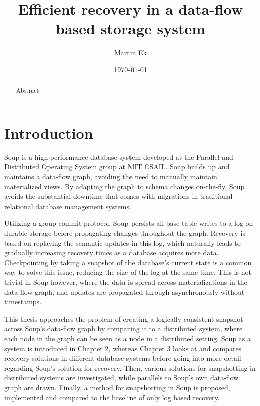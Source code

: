 \documentclass[b5paper]{report}
\begin{document}
\title{Efficient recovery in a data-flow based storage system}
\author{Martin Ek}
\date{\today}
\maketitle



\begin{abstract}
  Abstract
\end{abstract}

\tableofcontents
\pagebreak

\chapter{Introduction}
Soup is a high-performance database system developed at the Parallel and
Distributed Operating System group at MIT CSAIL. Soup builds up and maintains a
data-flow graph, avoiding the need to manually maintain materialized views. By
adapting the graph to schema changes on-the-fly, Soup avoids the substantial
downtime that comes with migrations in traditional relational database
management systems.

Utilizing a group-commit protocol, Soup persists all base table writes to
a log on durable storage before propagating changes throughout the graph.
Recovery is based on replaying the semantic updates in this log, which naturally
leads to gradually increasing recovery times as a database acquires more data.
Checkpointing by taking a snapshot of the database's current state is a common
way to solve this issue, reducing the size of the log at the same time. This is
not trivial in Soup however, where the data is spread across materializations in
the data-flow graph, and updates are propagated through asynchronously without
timestamps.

This thesis approaches the problem of creating a logically consistent snapshot
across Soup's data-flow graph by comparing it to a distributed system, where
each node in the graph can be seen as a node in a distributed setting. Soup as a
system is introduced in Chapter 2, whereas Chapter 3 looks at and compares
recovery solutions in different database systems before going into more detail
regarding Soup's solution for recovery. Then, various solutions for
snapshotting in distributed systems are investigated, while parallels to Soup's
own data-flow graph are drawn. Finally, a method for snapshotting in Soup is
proposed, implemented and compared to the baseline of only log based recovery.
\end{document}

